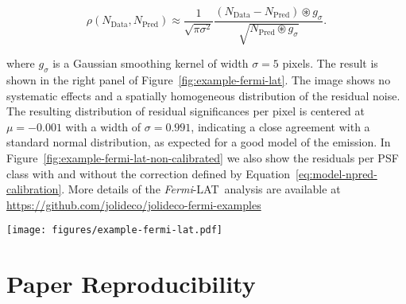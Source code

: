 \documentclass[twocolumn, linenumbers]{aastex631}
\newcommand{\fermi}{\textit{Fermi}-LAT~}
\newcommand{\jolideco}{\textit{Jolideco}~}
\begin{document}
    \begin{equation}
        \label{eq:approx-sigma}
        \rho(N_{\mathrm{Data}}, N_{\mathrm{Pred}}) \approx \frac{1}{\sqrt{\pi \sigma^2}}\frac{(N_{\mathrm{Data}} - N_{\mathrm{Pred}}) \circledast g_{\sigma}} {\sqrt{N_{\mathrm{Pred}}\circledast g_{\sigma}}}.
    \end{equation}
    
    where $g_{\sigma}$ is a Gaussian smoothing kernel of width $\sigma=5$ pixels. The result is shown in the right panel of Figure~\ref{fig:example-fermi-lat}. The image shows no systematic effects and a spatially homogeneous distribution of the residual noise. The resulting distribution of residual significances per pixel is centered at $\mu=-0.001$ with a width of $\sigma=0.991$, indicating a close agreement with a standard normal distribution, as expected for a good model of the emission. In Figure~\ref{fig:example-fermi-lat-non-calibrated} we also show the residuals per PSF class with and without the correction defined by Equation~\ref{eq:model-npred-calibration}. More details of the \fermi analysis are available at \url{https://github.com/jolideco/jolideco-fermi-examples}
    
      \begin{figure*}
        \begin{centering}
            \texttt{[image: figures/example-fermi-lat.pdf]}
            \caption{
                Illustration of the \jolideco result for the \fermi data of the supernova remnant \textit{RX J0852.0-4622} or \textit{Vela Junior}. The left image shows the counts above \qty[mode = text]{10}{GeV}. The different event classes are stacked into a single image with bin size $0.02$~degrees. The image in the center shows the flux reconstructed by the \jolideco method. The image on the right shows the standardized residuals as computed by Equation~\ref{eq:approx-sigma} and smoothed with a \textit{Gaussian} kernel of width 5~pixels $\approx 0.1$~degrees, similar to the size of the PSF.
                More information on this analysis example can be found on \url{https://github.com/jolideco/jolideco-fermi-examples}.
            }
            \label{fig:example-fermi-lat}
        \end{centering}
    \end{figure*}
    
    \section{Paper Reproducibility}
    \label{sec:reproducibility}
\end{document}
